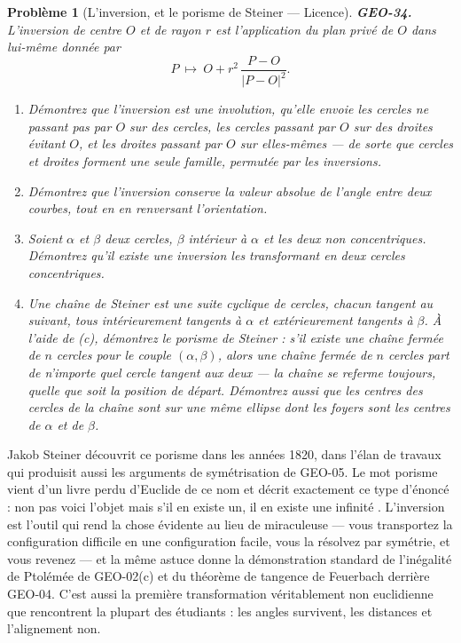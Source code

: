 \documentclass[11pt]{article}
\newtheorem{problem}{Problème}
\begin{document}
\begin{problem}[{L'inversion, et le porisme de Steiner --- Licence}]
\textbf{GEO-34.} L'inversion de centre $ O $ et de rayon $ r $ est l'application du plan
privé de $ O $ dans lui-même donnée par
\[ P \ \longmapsto \ O + r^2 \, \frac{P - O}{|P - O|^2} . \]
\begin{enumerate}
\item[(a)] Démontrez que l'inversion est une involution, qu'elle envoie les cercles ne passant pas par
$ O $ sur des cercles, les cercles passant par $ O $ sur des droites évitant $ O $, et les
droites passant par $ O $ sur elles-mêmes --- de sorte que \og{} cercles et droites \fg{} forment une seule
famille, permutée par les inversions.
\item[(b)] Démontrez que l'inversion conserve la valeur absolue de l'angle entre deux courbes, tout en en
renversant l'orientation.
\item[(c)] Soient $ \alpha $ et $ \beta $ deux cercles, $ \beta $ intérieur à $ \alpha $ et les
deux non concentriques. Démontrez qu'il existe une inversion les transformant en deux cercles
concentriques.
\item[(d)] Une \textit{chaîne de Steiner} est une suite cyclique de cercles, chacun tangent au suivant, tous
intérieurement tangents à $ \alpha $ et extérieurement tangents à $ \beta $. À l'aide de (c),
démontrez le porisme de Steiner : s'il existe une chaîne fermée de $ n $ cercles pour le couple
$ (\alpha, \beta) $, alors une chaîne fermée de $ n $ cercles part de \textit{n'importe quel}
cercle tangent aux deux --- la chaîne se referme toujours, quelle que soit la position de départ.
Démontrez aussi que les centres des cercles de la chaîne sont sur une même ellipse dont les foyers
sont les centres de $ \alpha $ et de $ \beta $.
\end{enumerate}

\end{problem}

\noindent Jakob Steiner découvrit ce porisme dans les années 1820, dans l'élan de travaux
qui produisit aussi les arguments de symétrisation de GEO-05. Le mot \og{} porisme \fg{} vient d'un livre
perdu d'Euclide de ce nom et décrit exactement ce type d'énoncé : non pas \og{} voici l'objet \fg{} mais
\og{} s'il en existe un, il en existe une infinité \fg{}. L'inversion est l'outil qui rend la chose évidente
au lieu de miraculeuse --- vous transportez la configuration difficile en une configuration facile,
vous la résolvez par symétrie, et vous revenez --- et la même astuce donne la démonstration standard
de l'inégalité de Ptolémée de GEO-02(c) et du théorème de tangence de Feuerbach derrière GEO-04.
C'est aussi la première transformation véritablement non euclidienne que rencontrent la plupart des
étudiants : les angles survivent, les distances et l'alignement non.
\end{document}
